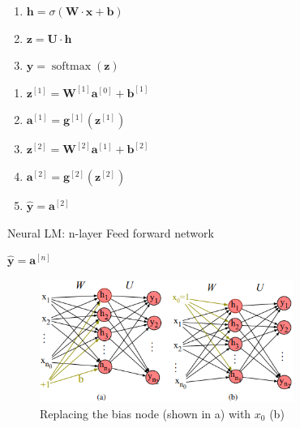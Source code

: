 \begin{table}[H]
    \begin{minipage}{3.5cm}
        \begin{enumerate}
            \item $\mathbf{h} = \sigma(\mathbf{W}\cdot \mathbf{x} + \mathbf{b})$
            \item $\mathbf{z} = \mathbf{U} \cdot \mathbf{h}$
            \item $\mathbf{y} = \operatorname{softmax}(\mathbf{z})$
        \end{enumerate}
    \end{minipage}
    \hfill
    \begin{minipage}{4.2cm}
        \begin{enumerate}
            \item $\mathbf{z}^{[1]} = \mathbf{W}^{[1]}\mathbf{a}^{[0]} +\mathbf{b}^{[1]}$
            \vspace{0.15cm}
            \item $\mathbf{a}^{[1]} = \mathbf{g}^{[1]}(\mathbf{z}^{[1]})$
            \vspace{0.15cm}
            \item $\mathbf{z}^{[2]} = \mathbf{W}^{[2]}\mathbf{a}^{[1]} +\mathbf{b}^{[2]}$
            \vspace{0.15cm}
            \item $\mathbf{a}^{[2]} = \mathbf{g}^{[2]}(\mathbf{z}^{[2]})$
            \vspace{0.15cm}
            \item $\mathbf{\hat{y}} = \mathbf{a}^{[2]}$
        \end{enumerate}
    \end{minipage}
    \hfill
    \begin{minipage}{6cm}
        \begin{algorithm}[H]
            \caption{Neural LM: n-layer Feed forward network}
            
            $\mathbf{\hat{y}} = \mathbf{a}^{[n]}$\;
        \end{algorithm}
    \end{minipage}
\end{table}

\begin{figure}[H]
    \centering
    \includegraphics[height=4cm]{Pictures/nlp/neural-nn-replace_bias.png}
    \caption{Replacing the bias node (shown in a) with $x_0$ (b)}
\end{figure}

